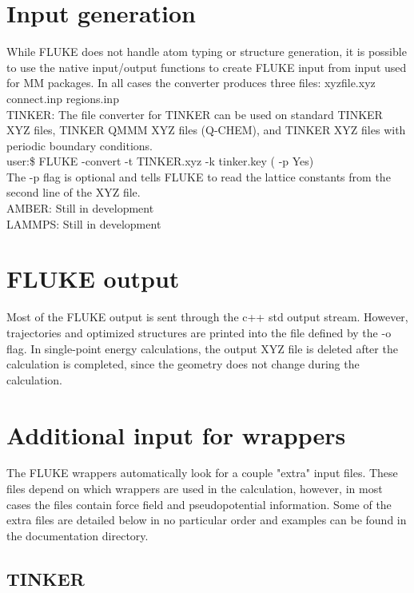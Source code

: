 \documentclass[12pt]{report}
\begin{document}
\section{Input generation}

While FLUKE does not handle atom typing or structure generation, it is
possible to use the native input/output functions to create FLUKE input from
input used for MM packages. In all cases the converter produces three
files: xyzfile.xyz connect.inp regions.inp \\

TINKER: The file converter for TINKER can be used on standard
TINKER XYZ files, TINKER QMMM XYZ files (Q-CHEM), and TINKER XYZ files
with periodic boundary conditions. \\

user:\$ FLUKE -convert -t TINKER.xyz -k tinker.key ( -p Yes) \\

The -p flag is optional and tells FLUKE to read the lattice constants from
the second line of the XYZ file. \\

AMBER: {\color{red}Still in development} \\

LAMMPS: {\color{red}Still in development}

\section{FLUKE output}

Most of the FLUKE output is sent through the c++ std output stream. However,
trajectories and optimized structures are printed into the file defined
by the -o flag. In single-point energy calculations, the output XYZ file
is deleted after the calculation is completed, since the geometry does not
change during the calculation.

\section{Additional input for wrappers}

The FLUKE wrappers automatically look for a couple "extra" input files. These
files depend on which wrappers are used in the calculation, however, in most
cases the files contain force field and pseudopotential information. Some of
the extra files are detailed below in no particular order and examples can be
found in the documentation directory.

\subsection{TINKER}
\end{document}
